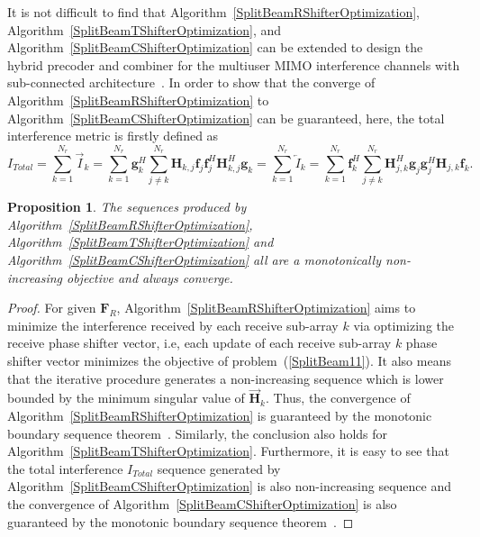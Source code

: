 \documentclass[11pt,draftcls,onecolumn]{IEEEtran}
\newtheorem{proposition}{Proposition}
\begin{document}
It is not difficult to find that Algorithm~\ref{SplitBeamRShifterOptimization}, Algorithm~\ref{SplitBeamTShifterOptimization}, and Algorithm~\ref{SplitBeamCShifterOptimization} can be extended to design the hybrid precoder and combiner for the multiuser MIMO interference channels with sub-connected architecture~\cite{TWCAlk2015}. In order to show that the converge of Algorithm~\ref{SplitBeamRShifterOptimization} to Algorithm~\ref{SplitBeamCShifterOptimization} can be guaranteed, here, the total interference metric is firstly defined as
\begin{equation}\label{SplitBeam17}
I_{Total}=\sum\limits_{k=1}^{N_{r}}\overrightarrow{I}_{k}=\sum\limits_{k=1}^{N_{r}}\bm{g}_{k}^{H}\sum_{j\neq k}^{N_{r}}\bm{H}_{k,j}\bm{f}_{j}\bm{f}_{j}^{H}\bm{H}_{k,j}^{H}\bm{g}_{k}
=\sum\limits_{k=1}^{N_{r}}\overleftarrow{I}_{k}=\sum\limits_{k=1}^{N_{r}}\bm{f}_{k}^{H}\sum_{j\neq k}^{N_{r}}\bm{H}_{j,k}^{H}\bm{g}_{j}\bm{g}_{j}^{H}\bm{H}_{j,k}\bm{f}_{k}.
\end{equation}

\begin{proposition}\label{SplitBeamPros01}
The sequences produced by Algorithm~\ref{SplitBeamRShifterOptimization}, Algorithm~\ref{SplitBeamTShifterOptimization} and Algorithm~\ref{SplitBeamCShifterOptimization} all are a monotonically non-increasing objective and always converge.
\end{proposition}
\begin{proof}
For given $\bm{F}_{R}$, Algorithm~\ref{SplitBeamRShifterOptimization} aims to minimize the interference received by each receive sub-array $k$ via optimizing the receive phase shifter vector, i.e, each update of each receive sub-array $k$ phase shifter vector minimizes the objective of problem~(\ref{SplitBeam11}). It also means that the iterative procedure generates a non-increasing sequence which is lower bounded by the minimum singular value of $\overrightarrow{\bm{H}}_{k}$. Thus, the convergence of Algorithm~\ref{SplitBeamRShifterOptimization} is guaranteed by the monotonic boundary sequence theorem~\cite{Bibby1974}. Similarly, the conclusion also holds for Algorithm~\ref{SplitBeamTShifterOptimization}. Furthermore, it is easy to see that the total interference $I_{Total}$ sequence generated by Algorithm~\ref{SplitBeamCShifterOptimization} is also non-increasing sequence and the convergence of Algorithm~\ref{SplitBeamCShifterOptimization} is also guaranteed by the monotonic boundary sequence theorem~\cite{Bibby1974}.
\end{proof}
\end{document}
